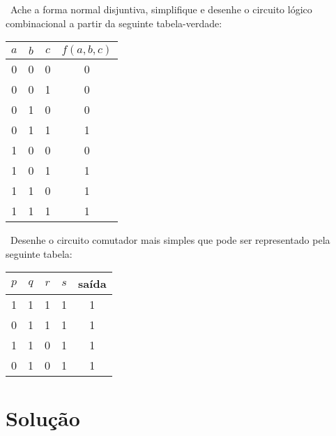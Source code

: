 \exercise~Ache a forma normal disjuntiva, simplifique e desenhe o
circuito lógico combinacional a partir da seguinte tabela-verdade:

\begin{center}
\begin{tabular}{ccc|c}
$a$ & $b$ & $c$ & $f(a,b,c)$\\\hline 
0 & 0 &0  &0\\
0 & 0 &1  &0\\
0 & 1 &0  &0\\
0 & 1 &1  &1\\
1 & 0 &0  &0\\
1 & 0 &1  &1\\
1 & 1 &0  &1\\
1 & 1 &1  &1\\
\end{tabular}
\end{center}

\exercise~Desenhe o circuito comutador mais simples que pode ser
representado pela seguinte tabela:

\begin{center}
\begin{tabular}[h]{cccc|c}
  $p$ & $q$ & $r$ & $s$ & saída \\\hline
  1 & 1 & 1 & 1 & 1 \\
  0 & 1 & 1 & 1 & 1 \\
  1 & 1 & 0 & 1 & 1 \\
  0 & 1 & 0 & 1 & 1 \\
\end{tabular}
\end{center}


\pagebreak
\footnotesize
\section*{Solução}
\setcounter{exno}{0}

\exercise\bigskip

